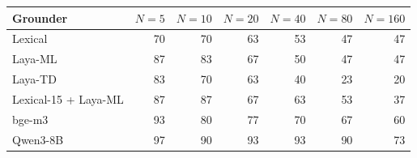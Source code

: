 \begin{tabular}{lrrrrrr}
\toprule
Grounder & $N{=}5$ & $N{=}10$ & $N{=}20$ & $N{=}40$ & $N{=}80$ & $N{=}160$ \\
\midrule
Lexical & 70 & 70 & 63 & 53 & 47 & 47 \\
Laya-ML & 87 & 83 & 67 & 50 & 47 & 47 \\
Laya-TD & 83 & 70 & 63 & 40 & 23 & 20 \\
Lexical-15 + Laya-ML & 87 & 87 & 67 & 63 & 53 & 37 \\
bge-m3 & 93 & 80 & 77 & 70 & 67 & 60 \\
Qwen3-8B & 97 & 90 & 93 & 93 & 90 & 73 \\
\bottomrule
\end{tabular}
